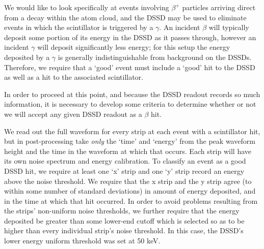 We would like to look specifically at events involving $\beta^+$ particles arriving direct from a decay within the atom cloud, and the DSSD may be used to eliminate events in which the scintillator is triggered by a $\gamma$.  An incident $\beta$ will typically deposit some portion of its energy in the DSSD as it passes through, however an incident $\gamma$ will deposit significantly less energy; for this setup the energy deposited by a $\gamma$ is generally indistinguishable from background on the DSSDs.  Therefore, we require that a `good' event must include a `good' hit to the DSSD as well as a hit to the associated scintillator.   

In order to proceed at this point, and because the DSSD readout records so much information, it is necessary to develop some criteria to determine whether or not we will accept any given DSSD readout as a $\beta$ hit.




We read out the full waveform for every strip at each event with a scintillator hit, but in post-processing take \emph{only} the `time' and `energy' from the peak waveform height and the time in the waveform at which that occurs. Each strip will have its own noise spectrum and energy calibration.  To classify an event as a good DSSD hit, we require at least one `x' strip and one `y' strip record an energy above the noise threshold.  We require that the x strip and the y strip agree (to within some number of standard deviations) in amount of energy deposited, and in the time at which that hit occurred.  In order to avoid problems resulting from the strips' non-uniform noise thresholds, we further require that the energy deposited be greater than some lower-end cutoff which is selected so as to be higher than every individual strip's noise threshold.  In this case, the DSSD's lower energy uniform threshold was set at 50 keV.  

